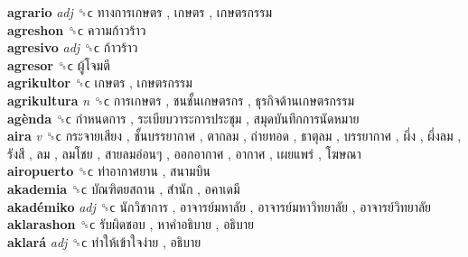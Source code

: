 \textbf{agrario} \emph{adj}  ␝ϲ   ทางการเกษตร ,  เกษตร ,  เกษตรกรรม   \\
\textbf{agreshon} ␝ϲ   ความก้าวร้าว   \\
\textbf{agresivo} \emph{adj}  ␝ϲ   ก้าวร้าว   \\
\textbf{agresor} ␝ϲ   ผู้โจมตี   \\
\textbf{agrikultor} ␝ϲ   เกษตร ,  เกษตรกรรม   \\
\textbf{agrikultura} \emph{n}  ␝ϲ   การเกษตร ,  ชนชั้นเกษตรกร ,  ธุรกิจด้านเกษตรกรรม   \\
\textbf{agènda} ␝ϲ   กำหนดการ ,  ระเบียบวาระการประชุม ,  สมุดบันทึกการนัดหมาย   \\
\textbf{aira} \emph{v}  ␝ϲ   กระจายเสียง ,  ชั้นบรรยากาศ ,  ตากลม ,  ถ่ายทอด ,  ธาตุลม ,  บรรยากาศ ,  ผึ่ง ,  ผึ่งลม ,  รังสี ,  ลม ,  ลมโชย ,  สายลมอ่อนๆ ,  ออกอากาศ ,  อากาศ ,  เผยแพร่ ,  โฆษณา   \\
\textbf{airopuerto} ␝ϲ   ท่าอากาศยาน ,  สนามบิน   \\
\textbf{akademia} ␝ϲ   บัณฑิตยสถาน ,  สำนัก ,  อคาเดมี   \\
\textbf{akadémiko} \emph{adj}  ␝ϲ   นักวิชาการ ,  อาจารย์มหาลัย ,  อาจารย์มหาวิทยาลัย ,  อาจารย์วิทยาลัย   \\
\textbf{aklarashon} ␝ϲ   รับผิดชอบ ,  หาคำอธิบาย ,  อธิบาย   \\
\textbf{aklará} \emph{adj}  ␝ϲ   ทำให้เข้าใจง่าย ,  อธิบาย   \\
